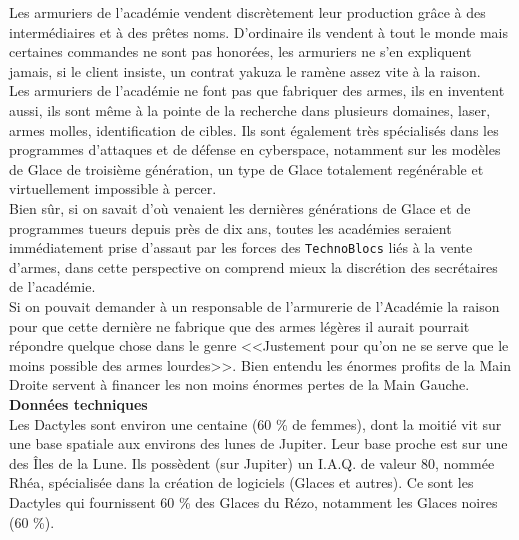 \documentclass[11pt,twoside,a4paper]{article}
\begin{document}
\begin{multicols*}{3}
{\columnbreak

Les armuriers de l'acad{\'e}mie vendent discr{\`e}tement leur production gr{\^a}ce {\`a} des interm{\'e}diaires et {\`a} des pr{\^e}tes noms. D'ordinaire ils vendent {\`a} tout le monde mais certaines commandes ne sont pas honor{\'e}es, les armuriers ne s'en expliquent jamais, si le client insiste, un contrat yakuza le ram{\`e}ne assez vite {\`a} la raison.~\\
 
Les armuriers de l'acad{\'e}mie ne font pas que fabriquer des armes, ils en inventent aussi, ils sont m{\^e}me {\`a} la pointe de la recherche dans plusieurs domaines, laser, armes molles, identification de cibles. Ils sont {\'e}galement tr{\`e}s sp{\'e}cialis{\'e}s dans les programmes d'attaques et de d{\'e}fense en cyberspace, notamment sur les mod{\`e}les de Glace de troisi{\`e}me g{\'e}n{\'e}ration, un type de Glace totalement reg{\'e}n{\'e}rable et virtuellement impossible {\`a} percer.~\\
 
Bien s{\^u}r, si on savait d'o{\`u} venaient les derni{\`e}res g{\'e}n{\'e}rations de Glace et de programmes tueurs depuis pr{\`e}s de dix ans, toutes les acad{\'e}mies seraient imm{\'e}diatement prise d'assaut par les forces des \texttt{TechnoBlocs} li{\'e}s {\`a} la vente d'armes, dans cette perspective on comprend mieux la discr{\'e}tion des secr{\'e}taires de l'acad{\'e}mie.~\\
 
Si on pouvait demander {\`a} un responsable de l'armurerie de l'Acad{\'e}mie la raison pour que cette derni{\`e}re ne fabrique que des armes l{\'e}g{\`e}res il aurait pourrait r{\'e}pondre quelque chose dans le genre <<Justement pour qu'on ne se serve que le moins possible des armes lourdes>>. Bien entendu les {\'e}normes profits de la Main Droite servent {\`a} financer les non moins {\'e}normes pertes de la Main Gauche.~\\

\textbf{Donn{\'e}es techniques}~\\

Les Dactyles sont environ une centaine (60 \% de femmes), dont la moiti{\'e} vit sur une base spatiale aux environs des lunes de Jupiter. Leur base proche est sur une des {\^I}les de la Lune. Ils poss{\`e}dent (sur Jupiter) un I.A.Q. de valeur 80, nomm{\'e}e Rh{\'e}a, sp{\'e}cialis{\'e}e dans la cr{\'e}ation de logiciels (Glaces et autres). Ce sont les Dactyles qui fournissent 60 \% des Glaces du R{\'e}zo, notamment les Glaces noires (60 \%).~\\

}
\end{multicols*}
\end{document}
